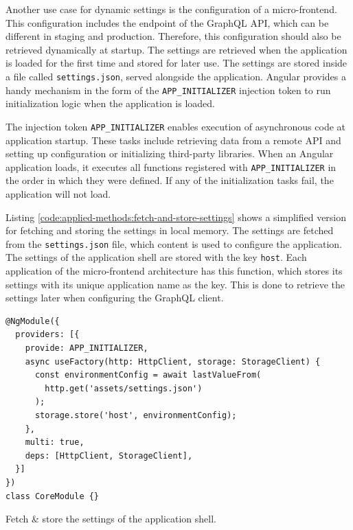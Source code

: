 \noindent Another use case for dynamic settings is the configuration of a micro-frontend. This configuration includes the endpoint of the GraphQL \ac{API}, which can be different in staging and production. Therefore, this configuration should also be retrieved dynamically at startup. The settings are retrieved when the application is loaded for the first time and stored for later use. The settings are stored inside a file called \texttt{settings.json}, served alongside the application. Angular provides a handy mechanism in the form of the \texttt{APP\_INITIALIZER} injection token to run initialization logic when the application is loaded.

\bigskip

\noindent The injection token \texttt{APP\_INITIALIZER} enables execution of asynchronous code at application startup. These tasks include retrieving data from a remote \ac{API} and setting up configuration or initializing third-party libraries. When an Angular application loads, it executes all functions registered with \texttt{APP\_INITIALIZER} in the order in which they were defined. If any of the initialization tasks fail, the application will not load. \cite{misc:-:applied-methods:prototype-implementation:angular-app-initializer}

\bigskip

\noindent Listing \ref{code:applied-methods:fetch-and-store-settings} shows a simplified version for fetching and storing the settings in local memory. The settings are fetched from the \texttt{settings.json} file, which content is used to configure the application. The settings of the application shell are stored with the key \texttt{host}. Each application of the micro-frontend architecture has this function, which stores its settings with its unique application name as the key. This is done to retrieve the settings later when configuring the GraphQL client. 

\ifshowListings
\begin{listing}[H]
\begin{verbatim}
@NgModule({
  providers: [{
    provide: APP_INITIALIZER,
    async useFactory(http: HttpClient, storage: StorageClient) {
      const environmentConfig = await lastValueFrom(
        http.get('assets/settings.json')
      );
      storage.store('host', environmentConfig);
    },
    multi: true,
    deps: [HttpClient, StorageClient],
  }]
})
class CoreModule {}
\end{verbatim}
\caption{Fetch \& store the settings of the application shell.}\label{code:applied-methods:fetch-and-store-settings}
\end{listing}
\fi

